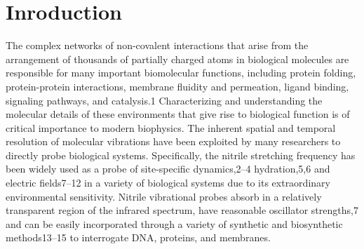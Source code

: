 \section{Inroduction}\label{intro}

The complex networks of non-covalent interactions that arise from the arrangement of thousands of partially charged atoms in biological molecules are responsible for many important biomolecular functions, including protein folding, protein-protein interactions, membrane fluidity and permeation, ligand binding, signaling pathways, and catalysis.1
Characterizing and understanding the molecular details of these environments that give rise to biological function is of critical importance to modern biophysics.
The inherent spatial and temporal resolution of molecular vibrations have been exploited by many researchers to directly probe biological systems.
Specifically, the nitrile stretching frequency has been widely used as a probe of site-specific dynamics,2–4 hydration,5,6 and electric fields7–12 in a variety of biological systems due to its extraordinary environmental sensitivity.
Nitrile vibrational probes absorb in a relatively transparent region of the infrared spectrum, have reasonable oscillator strengths,7 and can be easily incorporated through a variety of synthetic and biosynthetic methods13–15 to interrogate DNA, proteins, and membranes. 

